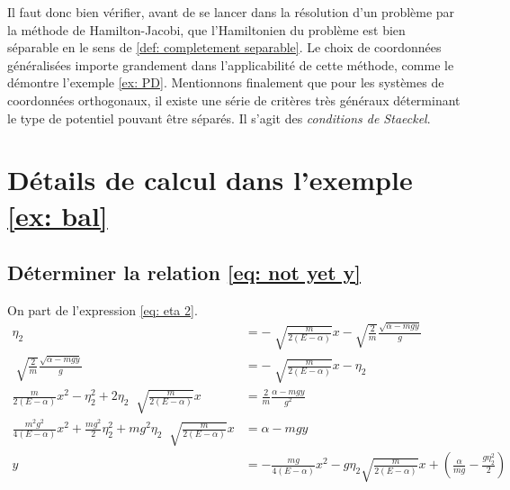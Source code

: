 \documentclass[11pt,oneside,a4paper]{article}
\begin{document}
    Il faut donc bien vérifier, avant de se lancer dans la résolution d'un problème par la méthode de Hamilton-Jacobi, que l'Hamiltonien du problème est bien séparable en le sens de \ref{def: completement separable}. Le choix de coordonnées généralisées importe grandement dans l'applicabilité de cette méthode, comme le démontre l'exemple \ref{ex: PD}. Mentionnons finalement que pour les systèmes de coordonnées orthogonaux, il existe une série de critères très généraux déterminant le type de potentiel pouvant être séparés. Il s'agit des \emph{conditions de Staeckel}.\\
    
    \color{black}
    \appendix
      \section{Détails de calcul dans l'exemple \ref{ex: bal}}\label{A: details}
      \subsection{Déterminer la relation \eqref{eq: not yet y}}
      On part de l'expression \eqref{eq: eta 2}.
      \begin{align}
        \eta_2 &= -\sqrt[]{\frac{m}{2\left(E-\alpha\right)}}x-\sqrt{\frac{2}{m}}\frac{\sqrt{\alpha-mgy}}{g}\\
        \sqrt[]{\frac{2}{m}}\frac{\sqrt{\alpha-mgy}}{g} &= -\sqrt[]{\frac{m}{2\left(E-\alpha\right)}}x-\eta_2\\
        \frac{m}{2\left(E-\alpha\right)}x^2-\eta_2^2 + 2\eta_2\;\sqrt[]{\frac{m}{2\left(E-\alpha\right)}}x &= \frac{2}{m}\frac{\alpha-mgy}{g^2}\\
        \frac{m^2g^2}{4\left(E-\alpha\right)}x^2+\frac{mg^2}{2}\eta_2^2+mg^2\eta_2\;\sqrt[]{\frac{m}{2\left(E-\alpha\right)}}x &= \alpha-mgy\\
        y &= -\frac{mg}{4\left(E-\alpha\right)}x^2-g\eta_2\sqrt{\frac{m}{2\left(E-\alpha\right)}}x+\left(\frac{\alpha}{mg}-\frac{g\eta_2^2}{2}\right)
      \end{align}
\end{document}
